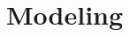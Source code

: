\documentclass[letterpaper, twocolumn]{article}
\begin{document}







\section{Modeling}
\end{document}
